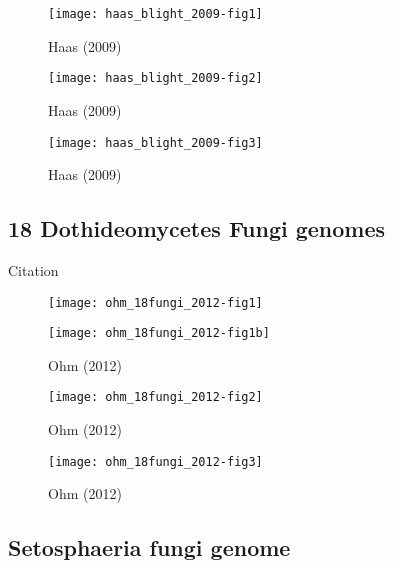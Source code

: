   \begin{figure}[h!]
    \centering
    \texttt{[image: haas\_blight\_2009-fig1]}
    \caption{
        Haas (2009) \cite{haas_genome_2009}
    }
  \end{figure}

  \begin{figure}[h!]
    \centering
    \texttt{[image: haas\_blight\_2009-fig2]}
    \caption{
        Haas (2009) \cite{haas_genome_2009}
    }
  \end{figure}

  \begin{figure}[h!]
    \centering
    \texttt{[image: haas\_blight\_2009-fig3]}
    \caption{
        Haas (2009) \cite{haas_genome_2009}
    }
  \end{figure}

  \FloatBarrier

\subsection{18 Dothideomycetes Fungi genomes}

  Citation \cite{ohm_diverse_2012}

  \begin{figure}[h!] \centering
    \texttt{[image: ohm\_18fungi\_2012-fig1]}
  \end{figure}

  \begin{figure}[h!] \centering
    \texttt{[image: ohm\_18fungi\_2012-fig1b]}
    \caption{Ohm (2012) \cite{ohm_diverse_2012}}
  \end{figure}

  \begin{figure}[h!] \centering
    \texttt{[image: ohm\_18fungi\_2012-fig2]}
    \caption{Ohm (2012) \cite{ohm_diverse_2012}}
  \end{figure}

  \begin{figure}[h!] \centering
    \texttt{[image: ohm\_18fungi\_2012-fig3]}
    \caption{Ohm (2012) \cite{ohm_diverse_2012}}
  \end{figure}

  \FloatBarrier

\subsection{Setosphaeria fungi genome}

